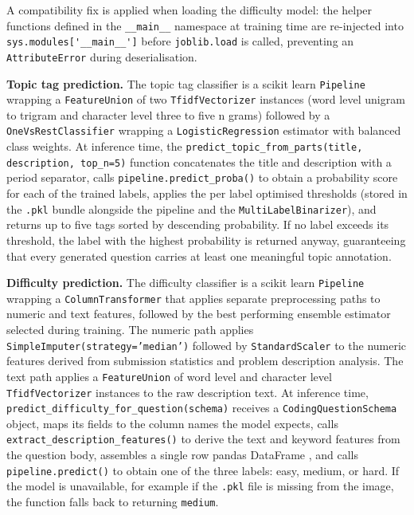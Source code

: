 {\sloppy
A compatibility fix is applied when loading the difficulty model: the
helper functions defined in the \verb|__main__| namespace at
training time are re-injected into \verb|sys.modules['__main__']|
before \verb|joblib.load| is called, preventing an
\verb|AttributeError| during deserialisation.
\par}

{\sloppy
\textbf{Topic tag prediction.} The topic tag classifier is a scikit
learn \verb|Pipeline| \cite{pedregosa2011,buitinck2013api} wrapping a
\verb|FeatureUnion| of two \verb|TfidfVectorizer| instances (word
level unigram to trigram and character level three to five n grams)
followed by a \verb|OneVsRestClassifier| wrapping a
\verb|LogisticRegression| estimator with balanced class weights. At
inference time, the
\verb|predict_topic_from_parts(title, description, top_n=5)| function
concatenates the title and description with a period separator, calls
\verb|pipeline.predict_proba()| to obtain a probability score for each
of the trained labels, applies the per label optimised thresholds
(stored in the \verb|.pkl| bundle alongside the pipeline and the
\verb|MultiLabelBinarizer|), and returns up to five tags sorted by
descending probability. If no label exceeds its threshold, the label
with the highest probability is returned anyway, guaranteeing that
every generated question carries at least one meaningful topic annotation.
\par}

\textbf{Difficulty prediction.} The difficulty classifier is a scikit
learn \texttt{Pipeline} wrapping a \texttt{ColumnTransformer} that
applies separate preprocessing paths to numeric and text features,
followed by the best performing ensemble estimator selected during
training. The numeric path applies \texttt{SimpleImputer(strategy='median')}
followed by \texttt{StandardScaler} to the numeric features derived
from submission statistics and problem description analysis. The text
path applies a \texttt{FeatureUnion} of word level and character level
\texttt{TfidfVectorizer} instances to the raw description text. At
inference time, \texttt{predict\_difficulty\_for\_question(schema)}
receives a \texttt{CodingQuestionSchema} object, maps its fields to the
column names the model expects, calls
\texttt{extract\_description\_features()} to derive the text and keyword
features from the question body, assembles a single row pandas DataFrame
\cite{mckinney2010pandas}, and calls \texttt{pipeline.predict()} to
obtain one of the three labels: easy, medium, or hard. If the model is
unavailable, for example if the \texttt{.pkl} file is missing from the
image, the function falls back to returning \texttt{medium}.

